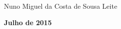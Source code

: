 \begin{titlepage}
\begin{center}
\begin{tabbing}
		   \fontsize{11pt}{10pt}\selectfont
		   \hspace{1.1cm}Nuno Miguel da Costa de Sousa Leite \\
		\end{tabbing}
		
		\fontsize{10pt}{10pt}\selectfont
		\textbf{Julho de 2015}
	\end{center}
	
\iffalse

	\newpage
	\thispagestyle{empty}
	\cleardoublepage
	\newpage
	\thispagestyle{empty}
	

\end{titlepage}
